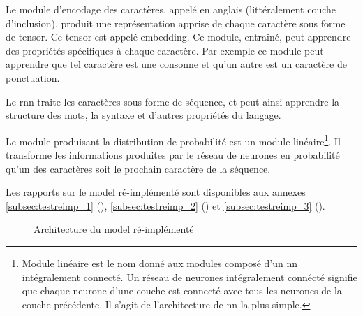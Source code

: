 Le module d'encodage des caractères, appelé  en anglais (littéralement \og couche d'inclusion\fg{}), produit une représentation apprise de chaque caractère sous forme de \gls{tensor}. Ce \gls{tensor} est appelé \gls{embedding}. Ce module, entraîné, peut apprendre des propriétés spécifiques à chaque caractère. Par exemple ce module peut apprendre que tel caractère est une consonne et qu'un autre est un caractère de ponctuation. \label{def:embedding}

Le \gls{rnn} traite les caractères sous forme de séquence, et peut ainsi apprendre la structure des mots, la syntaxe et d'autres propriétés du langage.

Le module produisant la distribution de probabilité est un module linéaire\footnote{\og Module linéaire \fg{} est le nom donné aux modules composé d'un \gls{nn} intégralement connecté. Un réseau de neurones intégralement connécté signifie que chaque neurone d'une couche est connecté avec tous les neurones de la couche précédente. Il s'agit de l'architecture de \gls{nn} la plus simple.\label{def:fully_connected}\label{def:lin_module}}.
Il transforme les informations produites par le réseau de neurones en probabilité qu'un des caractères soit le prochain caractère de la séquence.

Les rapports sur le \gls{model} ré-implémenté sont disponibles aux annexes \ref{subsec:testreimp_1} (), \ref{subsec:testreimp_2} () et \ref{subsec:testreimp_3} (). 

\begin{figure}[h]
	\centering
	\scalebox{1}{}
	\caption[Architecture du  ré-implémenté]{Architecture du \gls{model} ré-implémenté}
	\label{fig:reimplement}
\end{figure}
%
